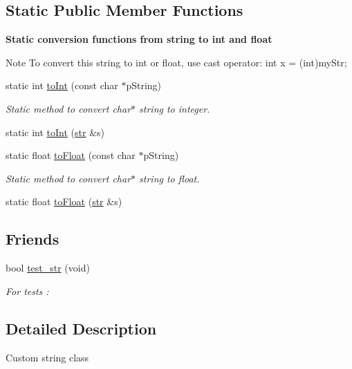 \subsection*{Static Public Member Functions}
\begin{Indent}{\bf Static conversion functions from string to int and float}\par
{\em \begin{DoxyNote}{Note}
To convert this string to int or float, use cast operator\+: int x = (int)my\+Str; 
\end{DoxyNote}
}\begin{DoxyCompactItemize}
\item 
static int \hyperlink{classstr_a8234c2630b21c5e5567010d4ea776daf}{to\+Int} (const char $\ast$p\+String)
\begin{DoxyCompactList}\small\item\em Static method to convert char$\ast$ string to integer. \end{DoxyCompactList}\item 
static int \hyperlink{classstr_ab17ef945df990ababe0f4fefbc551e7c}{to\+Int} (\hyperlink{classstr}{str} \&s)
\item 
static float \hyperlink{classstr_a1973e2dd48bf39a9d52743f201a5e3fc}{to\+Float} (const char $\ast$p\+String)
\begin{DoxyCompactList}\small\item\em Static method to convert char$\ast$ string to float. \end{DoxyCompactList}\item 
static float \hyperlink{classstr_ab388e72409c282225a5bbaa88288e564}{to\+Float} (\hyperlink{classstr}{str} \&s)
\end{DoxyCompactItemize}
\end{Indent}
\subsection*{Friends}
\begin{DoxyCompactItemize}
\item 
bool \hyperlink{classstr_a1aeec54df708cf8d8ac70a7ee1a32e52}{test\+\_\+str} (void)
\begin{DoxyCompactList}\small\item\em For tests \+: \end{DoxyCompactList}\end{DoxyCompactItemize}


\subsection{Detailed Description}
Custom string class

